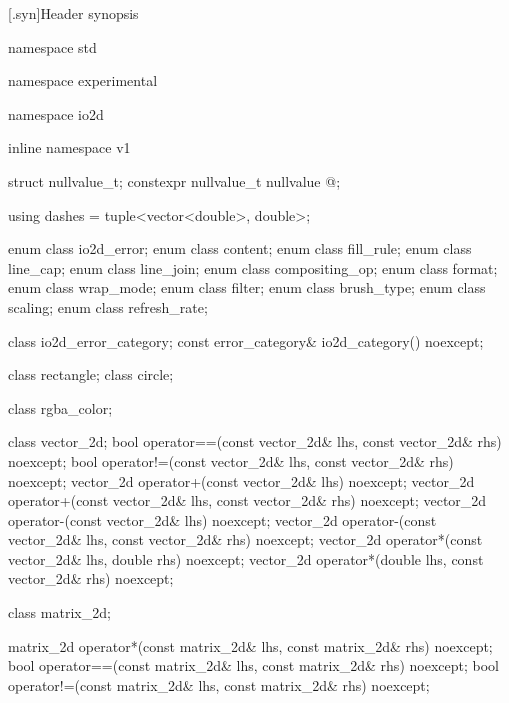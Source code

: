 [\iotwod.syn]{Header  synopsis}

%
\begin{codeblock}

namespace std { namespace experimental {
  namespace io2d { inline namespace v1 {

  struct nullvalue_t;
  constexpr nullvalue_t nullvalue{ @\impdef@ };

  using dashes = tuple<vector<double>, double>;

  enum class io2d_error;
  enum class content;
  enum class fill_rule;
  enum class line_cap;
  enum class line_join;
  enum class compositing_op;
  enum class format;
  enum class wrap_mode;
  enum class filter;
  enum class brush_type;
  enum class scaling;
  enum class refresh_rate;

  class io2d_error_category;
  const error_category& io2d_category() noexcept;

  class rectangle;
  class circle;

  class rgba_color;

  class vector_2d;
  bool operator==(const vector_2d& lhs, const vector_2d& rhs) noexcept;
  bool operator!=(const vector_2d& lhs, const vector_2d& rhs) noexcept;
  vector_2d operator+(const vector_2d& lhs) noexcept;
  vector_2d operator+(const vector_2d& lhs, const vector_2d& rhs) noexcept;
  vector_2d operator-(const vector_2d& lhs) noexcept;
  vector_2d operator-(const vector_2d& lhs, const vector_2d& rhs) noexcept;
  vector_2d operator*(const vector_2d& lhs, double rhs) noexcept;
  vector_2d operator*(double lhs, const vector_2d& rhs) noexcept;

  class matrix_2d;

  matrix_2d operator*(const matrix_2d& lhs, const matrix_2d& rhs) noexcept;
  bool operator==(const matrix_2d& lhs, const matrix_2d& rhs) noexcept;
  bool operator!=(const matrix_2d& lhs, const matrix_2d& rhs) noexcept;

}}}}
\end{codeblock}
